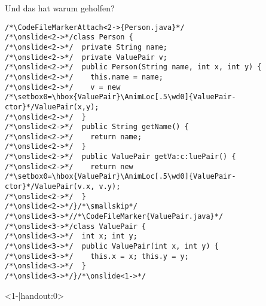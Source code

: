 {\iffull
\begin{frame}[fragile,t]{Und das hat warum geholfen?}
\begin{tikzpicture}[@O]
\end{tikzpicture}\vspace*{-\baselineskip}
\vspace*{-8mm}\columns[t,onlytextwidth]%
\begin{verbatim}
/*\CodeFileMarkerAttach<2->{Person.java}*/
/*\onslide<2->*/class Person {
/*\onslide<2->*/  private String name;
/*\onslide<2->*/  private ValuePair v;
/*\onslide<2->*/  public Person(String name, int x, int y) {
/*\onslide<2->*/    this.name = name;
/*\onslide<2->*/    v = new /*\setbox0=\hbox{ValuePair}\AnimLoc[.5\wd0]{ValuePair-ctor}*/ValuePair(x,y);
/*\onslide<2->*/  }
/*\onslide<2->*/  public String getName() {
/*\onslide<2->*/    return name;
/*\onslide<2->*/  }
/*\onslide<2->*/  public ValuePair getVa:c:luePair() {
/*\onslide<2->*/    return new /*\setbox0=\hbox{ValuePair}\AnimLoc[.5\wd0]{ValuePair-ctor}*/ValuePair(v.x, v.y);
/*\onslide<2->*/  }
/*\onslide<2->*/}/*\smallskip*/
/*\onslide<3->*//*\CodeFileMarker{ValuePair.java}*/
/*\onslide<3->*/class ValuePair {
/*\onslide<3->*/  int x; int y;
/*\onslide<3->*/  public ValuePair(int x, int y) {
/*\onslide<3->*/    this.x = x; this.y = y;
/*\onslide<3->*/  }
/*\onslide<3->*/}/*\onslide<1->*/
\end{verbatim}
\endAnimateCode
{}
\begin{onlyenv}<1-|handout:0>
\begin{verbatim}

\end{verbatim}
\end{onlyenv}
\end{frame}}
